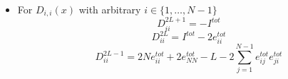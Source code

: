\documentclass[10pt]{article}
\numberwithin{equation}{section}
\numberwithin{equation}{subsection}
\begin{document}
\begin{itemize}

\item For $D_{i,i}(x)$ with arbitrary $ i\in\{1,\ldots,N-1\}$ 
\begin{equation}\label{a2lp}
	D_{ii}^{2L+1}=-I^{tot}
\end{equation}\begin{equation}\label{a2l}
	D_{ii}^{2L}=I^{tot}-2e_{ii}^{tot}
\end{equation}
\begin{equation}
	D_{ii}^{2L-1}=2Ne_{ii}^{tot}+ 2e_{NN}^{tot}-L -2\sum_{j=1}^{N-1}e_{ij}^{tot}e_{ji}^{tot}
\end{equation}




\end{itemize}
\end{document}
